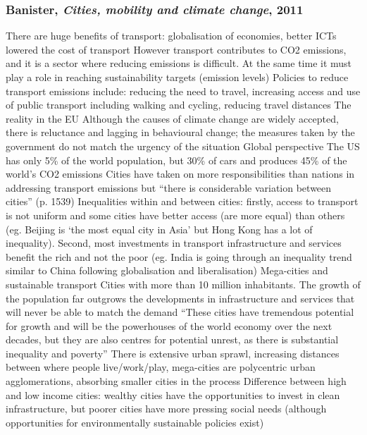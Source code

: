\documentclass{article}
\begin{document}
\subsubsection{Banister, \textit{Cities, mobility and climate change}, 2011}

\begin{outline}
	\1 There are huge benefits of transport: globalisation of economies, better ICTs lowered the cost of transport
	\1 However transport contributes to CO2 emissions, and it is a sector where reducing emissions is difficult. At the same time it must play a role in reaching sustainability targets (emission levels)
	\1 Policies to reduce transport emissions include: reducing the need to travel, increasing access and use of public transport including walking and cycling, reducing travel distances
	\1 The reality in the EU
		\2 Although the causes of climate change are widely accepted, there is reluctance and lagging in behavioural change; the measures taken by the government do not match the urgency of the situation
	\1 Global perspective
		\2 The US has only 5\% of the world population, but 30\% of cars and produces 45\% of the world's CO2 emissions
		\2 Cities have taken on more responsibilities than nations in addressing transport emissions but ``there is considerable variation between cities'' (p. 1539)
		\2 Inequalities within and between cities: firstly, access to transport is not uniform and some cities have better access (are more equal) than others (eg. Beijing is `the most equal city in Asia' but Hong Kong has a lot of inequality). Second, most investments in transport infrastructure and services benefit the rich and not the poor (eg. India is going through an inequality trend similar to China following globalisation and liberalisation)
	\1 Mega-cities and sustainable transport
		\2 Cities with more than 10 million inhabitants. The growth of the population far outgrows the developments in infrastructure and services that will never be able to match the demand
		\2 ``These cities have tremendous potential for growth and will be the powerhouses of the world economy over the next decades, but they are also centres for potential unrest, as there is substantial inequality and poverty''
		\2 There is extensive urban sprawl, increasing distances between where people live/work/play, mega-cities are polycentric urban agglomerations, absorbing smaller cities in the process
		\2 Difference between high and low income cities: wealthy cities have the opportunities to invest in clean infrastructure, but poorer cities have more pressing social needs (although opportunities for environmentally sustainable policies exist)

\end{outline}
\end{document}
